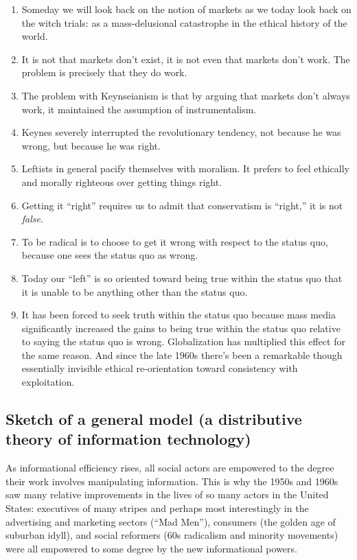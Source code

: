 \documentclass[12pt,book]{article}
\begin{document}
\begin{enumerate}
\def\labelenumi{\arabic{enumi}.}
\item
  Someday we will look back on the notion of markets as we today look
  back on the witch trials: as a mass-delusional catastrophe in the
  ethical history of the world.
\item
  It is not that markets don't exist, it is not even that markets don't
  work. The problem is precisely that they do work.
\item
  The problem with Keynseianism is that by arguing that markets don't
  always work, it maintained the assumption of instrumentalism.
\item
  Keynes severely interrupted the revolutionary tendency, not because he
  was wrong, but because he was right.
\item
  Leftists in general pacify themselves with moralism. It prefers to
  feel ethically and morally righteous over getting things right.
\item
  Getting it ``right'' requires us to admit that conservatism is
  ``right,'' it is not \emph{false}.
\item
  To be radical is to choose to get it wrong with respect to the status
  quo, because one sees the status quo as wrong.
\item
  Today our ``left'' is so oriented toward being true within the status
  quo that it is unable to be anything other than the status quo.
\item
  It has been forced to seek truth within the status quo because mass
  media significantly increased the gains to being true within the
  status quo relative to saying the status quo is wrong. Globalization
  has multiplied this effect for the same reason. And since the late
  1960s there's been a remarkable though essentially invisible ethical
  re-orientation toward consistency with exploitation.
\end{enumerate}

\subsection{Sketch of a general model (a distributive theory of
information
technology)}\label{sketch-of-a-general-model-a-distributive-theory-of-information-technology}

As informational efficiency rises, all social actors are empowered to
the degree their work involves manipulating information. This is why the
1950s and 1960s saw many relative improvements in the lives of so many
actors in the United States: executives of many stripes and perhaps most
interestingly in the advertising and marketing sectors (``Mad Men''),
consumers (the golden age of suburban idyll), and social reformers (60s
radicalism and minority movements) were all empowered to some degree by
the new informational powers.
\end{document}
